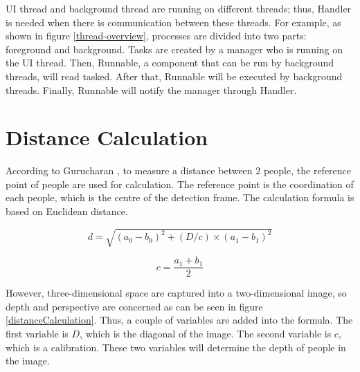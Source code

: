         UI thread and background thread are running on different threads;
        thus, Handler is needed when there is communication between these threads.
        For example, as shown in figure \ref{thread-overview},
        processes are divided into two parts: foreground and background.
        Tasks are created by a manager who is running on the UI thread.
        Then, Runnable, a component that can be run by background threads, will read tasked.
        After that, Runnable will be executed by background threads.
        Finally, Runnable will notify the manager through Handler.

    \section{Distance Calculation}\label{sectionDistanceCalculation}
        According to Gurucharan \cite{SOCIAL-DISTANCING-DETECTION}, to measure a distance between 2 people, the reference point of people are used for calculation.
        The reference point is the coordination of each people, which is the centre of the detection frame.
        The calculation formula is based on Euclidean distance.

        \begin{equation*}
            d = \sqrt{(a_{0}-b_{0})^{2}+(D/c)\times(a_{1}-b_{1})^{2}}
        \end{equation*}

        \begin{equation*}
            c = \frac{a_{1}+b_{1}}{2}
        \end{equation*}

        However, three-dimensional space are captured into a two-dimensional image,
        so depth and perspective are concerned as can be seen in figure \ref{distanceCalculation}.
        Thus, a couple of variables are added into the formula.
        The first variable is $D$, which is the diagonal of the image.
        The second variable is $c$, which is a calibration.
        These two variables will determine the depth of people in the image.

